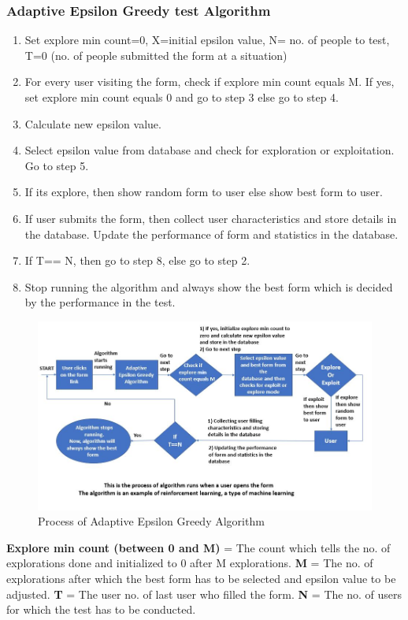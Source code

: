 \documentclass[12pt]{report}
\begin{document}
\subsubsection{Adaptive Epsilon Greedy test Algorithm}
\begin{enumerate}
\item Set explore min count=0, X=initial epsilon value, N= no. of people to test, T=0 (no. of people submitted the form at a situation)
\item For every user visiting the form, check if explore min count equals M. If yes, set explore min count equals 0 and go to step 3 else go to step 4.
\item Calculate new epsilon value.
\item Select epsilon value from database and check for exploration or exploitation. Go to step 5.
\item If its explore, then show random form to user else show best form to user.
\item If user submits the form, then collect user characteristics and store details in the database. Update the performance of form and statistics in the database.
\item If T== N, then go to step 8, else go to step 2.
\item Stop running the algorithm and always show the best form which is decided by the performance in the test.
\end{enumerate}
\begin{figure}[H]
\includegraphics[scale=0.7]{flowchart.jpg}
\caption{Process of Adaptive Epsilon Greedy Algorithm}
\end{figure}
\textbf{Explore min count (between 0 and M) } = The count which tells the no. of explorations done and  initialized to 0 after M explorations.
\newline \textbf{M} = The no. of explorations after which the best form has to be selected and epsilon value to be adjusted.
\newline \textbf{T} = The user no. of last user who filled the form.
\newline \textbf{N} = The no. of users for which the test has to be conducted.
\end{document}
